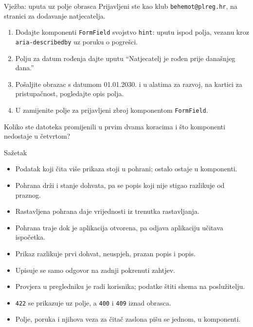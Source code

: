 \begin{frame}{Vježba: uputa uz polje obrasca}
Prijavljeni ste kao klub \texttt{behemot@plreg.hr}, na stranici za dodavanje natjecatelja.

\vspace{0.6em}
\begin{enumerate}
  \itemsep0.3em
  \item Dodajte komponenti \texttt{FormField} svojstvo \texttt{hint}: uputu ispod polja, vezanu kroz \texttt{aria-describedby} uz poruku o pogrešci.
  \item Polju za datum rođenja dajte uputu \enquote{Natjecatelj je rođen prije današnjeg dana.}
  \item Pošaljite obrazac s datumom 01.01.2030. i u alatima za razvoj, na kartici za pristupačnost, pogledajte opis polja.
  \item U  zamijenite polje za prijavljeni zbroj komponentom \texttt{FormField}.
\end{enumerate}

\vspace{0.6em}
Koliko ste datoteka promijenili u prvim dvama koracima i što komponenti nedostaje u četvrtom?
\end{frame}

\begin{frame}{Sažetak}
\begin{itemize}
  \itemsep0.15em
  \item Podatak koji čita više prikaza stoji u pohrani; ostalo ostaje u komponenti.
  \item Pohrana drži i stanje dohvata, pa se popis koji nije stigao razlikuje od praznog.
  \item Rastavljena pohrana daje vrijednosti iz trenutka rastavljanja.
  \item Pohrana traje dok je aplikacija otvorena, pa odjava aplikaciju učitava ispočetka.
  \item Prikaz razlikuje prvi dohvat, neuspjeh, prazan popis i popis.
  \item Upisuje se samo odgovor na zadnji pokrenuti zahtjev.
  \item Provjera u pregledniku je radi korisnika; podatke štiti shema na poslužitelju.
  \item \texttt{422} se prikazuje uz polje, a \texttt{400} i \texttt{409} iznad obrasca.
  \item Polje, poruka i njihova veza za čitač zaslona pišu se jednom, u komponenti.
\end{itemize}
\end{frame}


